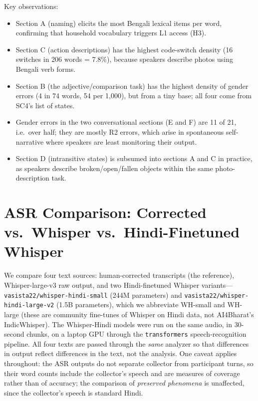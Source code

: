 \documentclass[11pt,a4paper]{report}
\begin{document}
Key observations:
\begin{itemize}
  \item Section A (naming) elicits the most Bengali lexical items per word, confirming that household vocabulary triggers L1 access (H3).
  \item Section C (action descriptions) has the highest code-switch density (16 switches in 206 words = 7.8\%), because speakers describe photos using Bengali verb forms.
  \item Section B (the adjective/comparison task) has the highest density of gender errors (4 in 74 words, 54 per 1,000), but from a tiny base; all four come from SC4's list of states.
  \item Gender errors in the two conversational sections (E and F) are 11 of 21, i.e.\ over half; they are mostly R2 errors, which arise in spontaneous self-narrative where speakers are least monitoring their output.
  \item Section D (intransitive states) is subsumed into sections A and C in practice, as speakers describe broken/open/fallen objects within the same photo-description task.
\end{itemize}

\chapter{ASR Comparison: Corrected vs.\ Whisper vs.\ Hindi-Finetuned Whisper}
\label{sec:asr}

We compare four text sources: human-corrected transcripts (the reference), Whisper-large-v3 raw output, and two Hindi-finetuned Whisper variants---\allowbreak\texttt{vasista22/\allowbreak whisper-\allowbreak hindi-\allowbreak small} (244M parameters) and \texttt{vasista22/\allowbreak whisper-\allowbreak hindi-\allowbreak large-v2} (1.5B parameters), which we abbreviate WH-small and WH-large (these are community fine-tunes of Whisper on Hindi data, not AI4Bharat's IndicWhisper). The Whisper-Hindi models were run on the same audio, in 30-second chunks, on a laptop GPU through the \texttt{transformers} speech-recognition pipeline. All four texts are passed through the \emph{same} analyzer so that differences in output reflect differences in the text, not the analysis. One caveat applies throughout: the ASR outputs do not separate collector from participant turns, so their word counts include the collector's speech and are measures of coverage rather than of accuracy; the comparison of \emph{preserved phenomena} is unaffected, since the collector's speech is standard Hindi.
\end{document}
